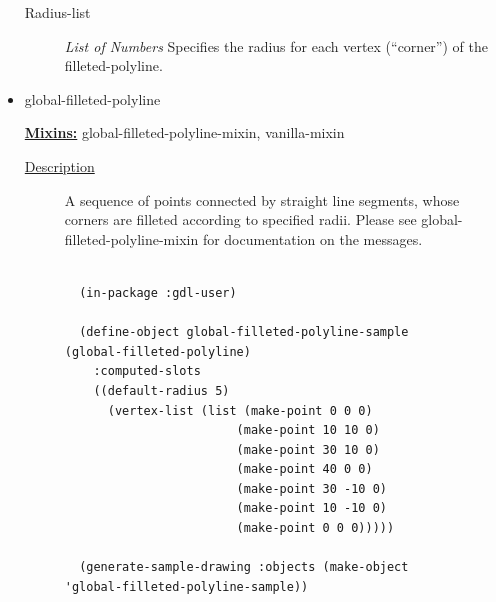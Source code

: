 \documentclass [11pt]{book}
\begin{document}
\begin{itemize}
\begin{description}
\item [Radius-list]
\emph{List of Numbers} Specifies the radius for each vertex (``corner'') of the filleted-polyline.


\end{description}







\item {}global-filleted-polyline


\textbf{
\underline{Mixins:}} global-filleted-polyline-mixin, vanilla-mixin





\begin{description}

\item [
\underline{Description}]


A sequence of points connected by straight line segments, whose
corners are filleted according to specified radii. Please see global-filleted-polyline-mixin
for documentation on the messages.



\end{description}




\begin{figure}
\begin{lrbox}{\boxedverb}
\begin{minipage}{\linewidth}
{\small

\begin{verbatim}

  (in-package :gdl-user)

  (define-object global-filleted-polyline-sample (global-filleted-polyline)
    :computed-slots
    ((default-radius 5)
      (vertex-list (list (make-point 0 0 0)
                        (make-point 10 10 0)
                        (make-point 30 10 0)
                        (make-point 40 0 0)
                        (make-point 30 -10 0)
                        (make-point 10 -10 0)
                        (make-point 0 0 0)))))

  (generate-sample-drawing :objects (make-object 'global-filleted-polyline-sample))

  
\end{verbatim}}
\end{minipage}
\end{lrbox}
\fbox{\usebox{\boxedverb}}


\end{figure}
\end{itemize}
\end{document}
